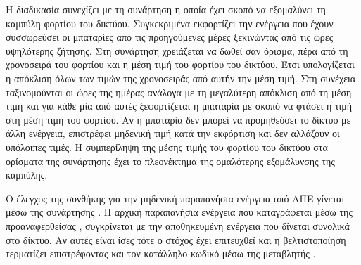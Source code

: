 \documentclass[12pt]{report}
\begin{document}
{}

Η διαδικασία συνεχίζει με τη συνάρτηση {\textbf{{}}} η οποία έχει σκοπό να εξομαλύνει τη καμπύλη φορτίου του δικτύου. Συγκεκριμένα εκφορτίζει την ενέργεια που έχουν συσσωρεύσει οι μπαταρίες από τις
προηγούμενες μέρες ξεκινώντας από τις ώρες υψηλότερης ζήτησης. Στη συνάρτηση χρειάζεται να δωθεί σαν όρισμα, πέρα από τη χρονοσειρά του φορτίου και η μέση τιμή του φορτίου του δικτύου. Έτσι υπολογίζεται η
απόκλιση όλων των τιμών της χρονοσειράς από αυτήν την μέση τιμή. Στη συνέχεια ταξινομούνται οι ώρες της ημέρας ανάλογα με τη μεγαλύτερη απόκλιση από τη μέση τιμή και για κάθε μία από αυτές ξεφορτίζεται η μπαταρία με σκοπό να 
φτάσει η τιμή στη μέση τιμή του φορτίου. Αν η μπαταρία δεν μπορεί να προμηθεύσει το δίκτυο με άλλη ενέργεια, επιστρέφει μηδενική τιμή κατά την εκφόρτιση και δεν αλλάζουν οι υπόλοιπες τιμές. Η συμπερίληψη της μέσης τιμής του φορτίου
του δικτύου στα ορίσματα της συνάρτησης έχει το πλεονέκτημα της ομαλότερης εξομάλυνσης της καμπύλης.

{}

Ο έλεγχος της συνθήκης για την μηδενική παραπανήσια ενέργεια από ΑΠΕ γίνεται μέσω της συνάρτησης {\textbf{{}}}. Η αρχική παραπανήσια ενέργεια που καταγράφεται μέσω της προαναφερθείσας 
{\textbf{{}}}, συγκρίνεται με την αποθηκευμένη ενέργεια που δίνεται συνολικά στο δίκτυο. Αν αυτές είναι ίσες τότε ο στόχος έχει επιτευχθεί και η βελτιστοποίηση τερματίζει επιστρέφοντας και τον κατάλληλο
κωδικό μέσω της μεταβλητής {}.
\end{document}
